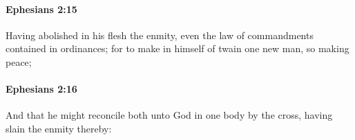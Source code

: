 		\paragraph{Ephesians 2:15} %
			\label{EPHESIANS-2-15}

			Having abolished in his flesh the enmity, even the law of commandments contained in ordinances; for to make in himself of twain one new man, so making peace;

			\begin{framed}
			\scriptsize
				\begin{compactdesc}
					\item[SBLG] 
				\end{compactdesc}
			\end{framed}

		\paragraph{Ephesians 2:16} %
			\label{EPHESIANS-2-16}

			And that he might reconcile both unto God in one body by the cross, having slain the enmity thereby:

